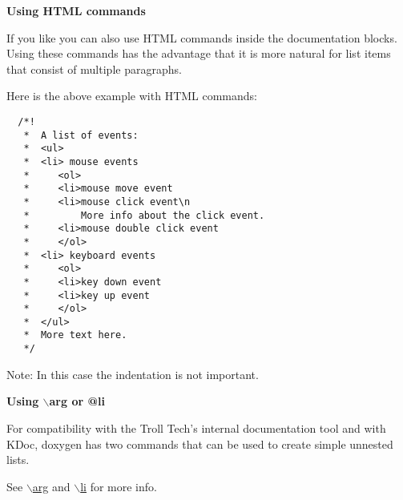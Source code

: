 {\bf Using HTML commands}

If you like you can also use HTML commands inside the documentation blocks. Using these commands has the advantage that it is more natural for list items that consist of multiple paragraphs.

Here is the above example with HTML commands: 

\footnotesize\begin{verbatim}
  /*! 
   *  A list of events:
   *  <ul>
   *  <li> mouse events
   *     <ol>
   *     <li>mouse move event
   *     <li>mouse click event\n
   *         More info about the click event.
   *     <li>mouse double click event
   *     </ol>
   *  <li> keyboard events
   *     <ol>     
   *     <li>key down event
   *     <li>key up event
   *     </ol>
   *  </ul>
   *  More text here.
   */
\end{verbatim}
\normalsize


\begin{Desc}
\item[Note:]In this case the indentation is not important.\end{Desc}
{\bf Using $\backslash$arg or @li}

For compatibility with the Troll Tech's internal documentation tool and with KDoc, doxygen has two commands that can be used to create simple unnested lists.

See \hyperlink{commands_cmdarg}{$\backslash$arg} and \hyperlink{commands_cmdli}{$\backslash$li} for more info.

 